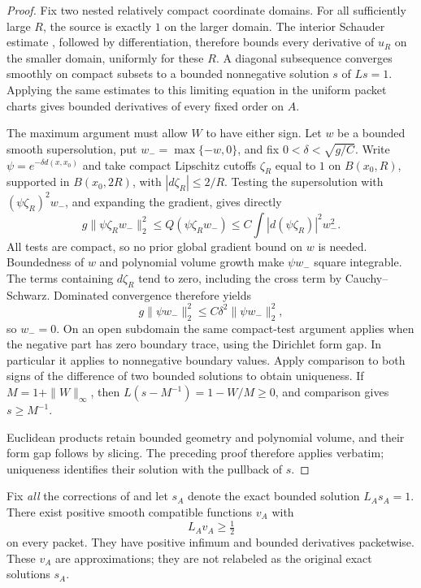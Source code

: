 \begin{proof}
Fix two nested relatively compact coordinate domains.  For all
sufficiently large $R$, the source is exactly $1$ on the larger domain.
The interior Schauder estimate
\citep[Lecture~12, Theorem~2]{simonPDE}, followed by differentiation,
therefore bounds every derivative of $u_R$ on the smaller domain,
uniformly for these $R$.  A diagonal subsequence converges smoothly
on compact subsets to a bounded nonnegative solution $s$ of $Ls=1$.
Applying the same estimates to this limiting equation in the uniform
packet charts gives bounded derivatives of every fixed order on $A$.

The maximum argument must allow $W$ to have either sign.  Let $w$ be
a bounded smooth supersolution, put $w_-=\max\{-w,0\}$, and fix
$0<\delta<\sqrt{g/C}$.  Write
$\psi=e^{-\delta d(x,x_0)}$ and take compact Lipschitz cutoffs
$\zeta_R$ equal to $1$ on $B(x_0,R)$, supported in $B(x_0,2R)$,
with $|d\zeta_R|\le 2/R$.  Testing the supersolution with
$(\psi\zeta_R)^2w_-$, and expanding the gradient, gives directly
\[
 g\|\psi\zeta_R w_-\|_2^2
 \le Q(\psi\zeta_R w_-)
 \le C\int |d(\psi\zeta_R)|^2w_-^2.
\]
All tests are compact, so no prior global gradient bound on $w$ is
needed.  Boundedness of $w$ and polynomial volume growth make
$\psi w_-$ square integrable.  The terms containing $d\zeta_R$ tend
to zero, including the cross term by Cauchy--Schwarz.  Dominated
convergence therefore yields
\[
 g\|\psi w_-\|_2^2\le C\delta^2\|\psi w_-\|_2^2,
\]
so $w_-=0$.  On an open subdomain the same compact-test argument
applies when the negative part has zero boundary trace, using the
Dirichlet form gap.  In particular it applies to nonnegative boundary
values.  Apply comparison to both signs of the difference of two
bounded solutions to obtain uniqueness.  If $M=1+\|W\|_\infty$, then
$L(s-M^{-1})=1-W/M\ge0$, and comparison gives $s\ge M^{-1}$.

Euclidean products retain bounded geometry and polynomial volume,
and their form gap follows by slicing.  The preceding proof therefore
applies verbatim; uniqueness identifies their solution with the
pullback of $s$.
\end{proof}

\begin{lemma}\label{regular:solutions}
Fix \emph{all} the corrections of  and let
$s_A$ denote the exact bounded solution $L_As_A=1$.  There exist
positive smooth compatible functions $v_A$ with
\begin{equation}\label{regular:strict-supersolution}
 L_Av_A\ge\tfrac12
\end{equation}
on every packet.  They have positive infimum and bounded derivatives
packetwise.  These $v_A$ are approximations; they are not relabeled as
the original exact solutions $s_A$.
\end{lemma}

